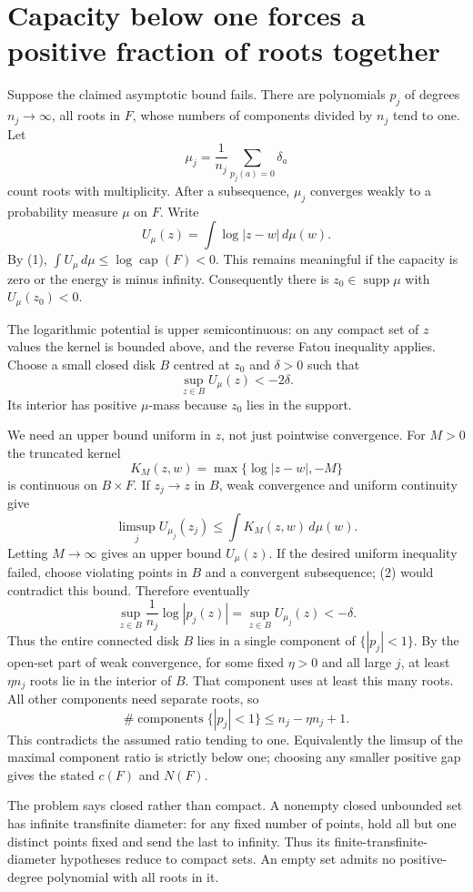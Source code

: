 \documentclass[11pt]{article}
\begin{document}
\section*{Capacity below one forces a positive fraction of roots together}
Suppose the claimed asymptotic bound fails. There are polynomials $p_j$ of degrees $n_j\to\infty$, all roots in $F$, whose numbers of components divided by $n_j$ tend to one. Let
\[
 \mu_j=\frac1{n_j}\sum_{p_j(a)=0}\delta_a
\]
count roots with multiplicity. After a subsequence, $\mu_j$ converges weakly to a probability measure $\mu$ on $F$. Write
\[
 U_\mu(z)=\int\log|z-w|\,d\mu(w).
\]
By (1), $\int U_\mu\,d\mu\le\log\operatorname{cap}(F)<0$. This remains meaningful if the capacity is zero or the energy is minus infinity. Consequently there is $z_0\in\operatorname{supp}\mu$ with $U_\mu(z_0)<0$.

The logarithmic potential is upper semicontinuous: on any compact set of $z$ values the kernel is bounded above, and the reverse Fatou inequality applies. Choose a small closed disk $B$ centred at $z_0$ and $\delta>0$ such that
\[
 \sup_{z\in B}U_\mu(z)<-2\delta.
\tag{2}
\]
Its interior has positive $\mu$-mass because $z_0$ lies in the support.

We need an upper bound uniform in $z$, not just pointwise convergence. For $M>0$ the truncated kernel
\[
 K_M(z,w)=\max\{\log|z-w|,-M\}
\]
is continuous on $B\times F$. If $z_j\to z$ in $B$, weak convergence and uniform continuity give
\[
 \limsup_j U_{\mu_j}(z_j)
 \le\int K_M(z,w)\,d\mu(w).
\]
Letting $M\to\infty$ gives an upper bound $U_\mu(z)$. If the desired uniform inequality failed, choose violating points in $B$ and a convergent subsequence; (2) would contradict this bound. Therefore eventually
\[
 \sup_{z\in B}\frac1{n_j}\log|p_j(z)|
 =\sup_{z\in B}U_{\mu_j}(z)<-\delta.
\tag{3}
\]
Thus the entire connected disk $B$ lies in a single component of $\{|p_j|<1\}$. By the open-set part of weak convergence, for some fixed $\eta>0$ and all large $j$, at least $\eta n_j$ roots lie in the interior of $B$. That component uses at least this many roots. All other components need separate roots, so
\[
 \#\operatorname{components}\{|p_j|<1\}\le n_j-\eta n_j+1.
\]
This contradicts the assumed ratio tending to one. Equivalently the limsup of the maximal component ratio is strictly below one; choosing any smaller positive gap gives the stated $c(F)$ and $N(F)$.

The problem says closed rather than compact. A nonempty closed unbounded set has infinite transfinite diameter: for any fixed number of points, hold all but one distinct points fixed and send the last to infinity. Thus its finite-transfinite-diameter hypotheses reduce to compact sets. An empty set admits no positive-degree polynomial with all roots in it.
\end{document}
